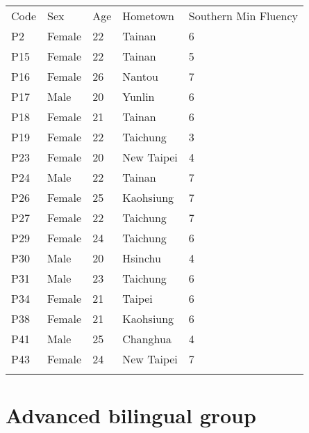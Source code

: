\begin{flushleft}
\begin{table}[hbt!]
\begin{tabularx}{\textwidth}{|l||X|X|X|X|}
\hhline{~~~~~}\noalign{\vspace*{\doublerulesep}}
\hhline{-||----}
Code&Sex&Age&Hometown&Southern Min Fluency\\
\hhline{=::====}
P2&Female&22&Tainan&6\\
\hhline{-||----}
P15&Female&22&Tainan&5\\
\hhline{-||----}
P16&Female&26&Nantou&7\\
\hhline{-||----}
P17&Male&20&Yunlin&6\\
\hhline{-||----}
P18&Female&21&Tainan&6\\
\hhline{-||----}
P19&Female&22&Taichung&3\\
\hhline{-||----}
P23&Female&20&New Taipei&4\\
\hhline{-||----}
P24&Male&22&Tainan&7\\
\hhline{-||----}
P26&Female&25&Kaohsiung&7\\
\hhline{-||----}
P27&Female&22&Taichung&7\\
\hhline{-||----}
P29&Female&24&Taichung&6\\
\hhline{-||----}
P30&Male&20&Hsinchu&4\\
\hhline{-||----}
P31&Male&23&Taichung&6\\
\hhline{-||----}
P34&Female&21&Taipei&6\\
\hhline{-||----}
P38&Female&21&Kaohsiung&6\\
\hhline{-||----}
P41&Male&25&Changhua&4\\
\hhline{-||----}
P43&Female&24&New Taipei&7\\
\hhline{-||----}

\end{tabularx}
\end{table}
\end{flushleft}

\section{Advanced bilingual group}

